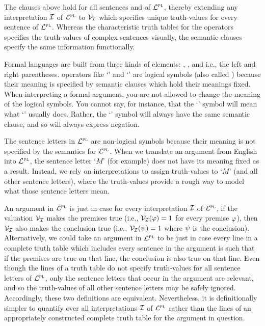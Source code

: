 The clauses above hold for all sentences \metaA and \metaB of $\mathcal{L}^{\textsc{pl}}$, thereby extending any interpretation $\mathcal{I}$ of $\mathcal{L}^{\textsc{pl}}$ to $\mathcal{V}_{\mathcal{I}}$ which specifies unique truth-values for every sentence of $\mathcal{L}^{\textsc{pl}}$.
Whereas the characteristic truth tables for the operators specifies the truth-values of complex sentences visually, the semantic clauses specify the same information functionally.

Formal languages are built from three kinds of elements: , , and  i.e., the left and right parentheses.
operators like `\eand' and `\eif' are logical symbols (also called ) because their meaning is specified by semantic clauses which hold their meanings fixed.
When interpreting a formal argument, you are not allowed to change the meaning of the logical symbols.
You cannot say, for instance, that the `\enot' symbol will mean what `\eand' usually does.
Rather, the `\enot' symbol will always have the same semantic clause, and so will always express negation.

The sentence letters in $\mathcal{L}^{\textsc{pl}}$ are non-logical symbols because their meaning is not specified by the semantics for $\mathcal{L}^{\textsc{pl}}$.
When we translate an argument from English into $\mathcal{L}^{\textsc{pl}}$, the sentence letter `$M$' (for example) does not have its meaning fixed as a result.
Instead, we rely on interpretations to assign truth-values to `$M$' (and all other sentence letters), where the truth-values provide a rough way to model what those sentence letters mean.

An argument in $\mathcal{L}^{\textsc{pl}}$ is  just in case for every interpretation $\mathcal{I}$ of $\mathcal{L}^{\textsc{pl}}$, if the valuation $\mathcal{V}_{\mathcal{I}}$ makes the premises true (i.e., $\mathcal{V}_{\mathcal{I}}(\varphi)=1$ for every premise $\varphi$), then $\mathcal{V}_{\mathcal{I}}$ also makes the conclusion true (i.e., $\mathcal{V}_{\mathcal{I}}(\psi)=1$ where $\psi$ is the conclusion).
Alternatively, we could take an argument in $\mathcal{L}^{\textsc{pl}}$ to be  just in case every line in a complete truth table which includes every sentence in the argument is such that if the premises are true on that line, the conclusion is also true on that line.
Even though the lines of a truth table do not specify truth-values for all sentence letters of $\mathcal{L}^{\textsc{pl}}$, only the sentence letters that occur in the argument are relevant, and so the truth-values of all other sentence letters may be safely ignored.
Accordingly, these two definitions are equivalent.
Nevertheless, it is definitionally simpler to quantify over all interpretations $\mathcal{I}$ of $\mathcal{L}^{\textsc{pl}}$ rather than the lines of an appropriately constructed complete truth table for the argument in question.

